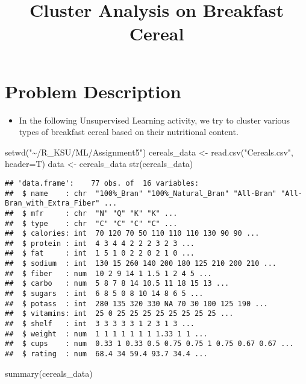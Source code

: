 \documentclass[
]{article}
\title{Cluster Analysis on Breakfast Cereal}
\author{}
\date{\vspace{-2.5em}}
\newenvironment{Shaded}{\begin{snugshade}}{\end{snugshade}}
\newcommand{\AttributeTok}[1]{\textcolor[rgb]{0.77,0.63,0.00}{#1}}
\newcommand{\FunctionTok}[1]{\textcolor[rgb]{0.00,0.00,0.00}{#1}}
\newcommand{\NormalTok}[1]{#1}
\newcommand{\OtherTok}[1]{\textcolor[rgb]{0.56,0.35,0.01}{#1}}
\newcommand{\StringTok}[1]{\textcolor[rgb]{0.31,0.60,0.02}{#1}}
\providecommand{\tightlist}{%
  \setlength{\itemsep}{0pt}\setlength{\parskip}{0pt}}
\begin{document}
\maketitle

\hypertarget{problem-description}{%
\section{Problem Description}\label{problem-description}}

\begin{itemize}
\tightlist
\item
  In the following Unsupervised Learning activity, we try to cluster
  various types of breakfast cereal based on their nutritional content.
\end{itemize}

\begin{Shaded}
\begin{Highlighting}[]
\FunctionTok{setwd}\NormalTok{(}\StringTok{"\textasciitilde{}/R\_KSU/ML/Assignment5"}\NormalTok{)}
\NormalTok{cereals\_data }\OtherTok{\textless{}{-}} \FunctionTok{read.csv}\NormalTok{(}\StringTok{"Cereals.csv"}\NormalTok{, }\AttributeTok{header=}\NormalTok{T)}
\NormalTok{data }\OtherTok{\textless{}{-}}\NormalTok{ cereals\_data}
\FunctionTok{str}\NormalTok{(cereals\_data)}
\end{Highlighting}
\end{Shaded}

\begin{verbatim}
## 'data.frame':    77 obs. of  16 variables:
##  $ name    : chr  "100%_Bran" "100%_Natural_Bran" "All-Bran" "All-Bran_with_Extra_Fiber" ...
##  $ mfr     : chr  "N" "Q" "K" "K" ...
##  $ type    : chr  "C" "C" "C" "C" ...
##  $ calories: int  70 120 70 50 110 110 110 130 90 90 ...
##  $ protein : int  4 3 4 4 2 2 2 3 2 3 ...
##  $ fat     : int  1 5 1 0 2 2 0 2 1 0 ...
##  $ sodium  : int  130 15 260 140 200 180 125 210 200 210 ...
##  $ fiber   : num  10 2 9 14 1 1.5 1 2 4 5 ...
##  $ carbo   : num  5 8 7 8 14 10.5 11 18 15 13 ...
##  $ sugars  : int  6 8 5 0 8 10 14 8 6 5 ...
##  $ potass  : int  280 135 320 330 NA 70 30 100 125 190 ...
##  $ vitamins: int  25 0 25 25 25 25 25 25 25 25 ...
##  $ shelf   : int  3 3 3 3 3 1 2 3 1 3 ...
##  $ weight  : num  1 1 1 1 1 1 1 1.33 1 1 ...
##  $ cups    : num  0.33 1 0.33 0.5 0.75 0.75 1 0.75 0.67 0.67 ...
##  $ rating  : num  68.4 34 59.4 93.7 34.4 ...
\end{verbatim}

\begin{Shaded}
\begin{Highlighting}[]
\FunctionTok{summary}\NormalTok{(cereals\_data)}
\end{Highlighting}
\end{Shaded}
\end{document}
